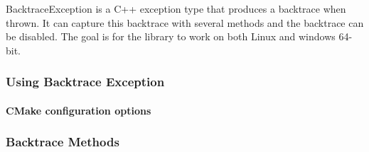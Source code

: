 Backtrace\-Exception is a C++ exception type that produces a backtrace when thrown. It can capture this backtrace with several methods and the backtrace can be disabled. The goal is for the library to work on both Linux and windows 64-\/bit.

\subsubsection*{Using Backtrace Exception}

\paragraph*{C\-Make configuration options}

\subsubsection*{Backtrace Methods}
